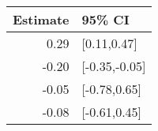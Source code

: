 \begin{tabular}{rl}
  \hline
Estimate & 95\% CI \\ 
  \hline
0.29 & [0.11,0.47] \\ 
  -0.20 & [-0.35,-0.05] \\ 
  -0.05 & [-0.78,0.65] \\ 
  -0.08 & [-0.61,0.45] \\ 
   \hline
\end{tabular}


